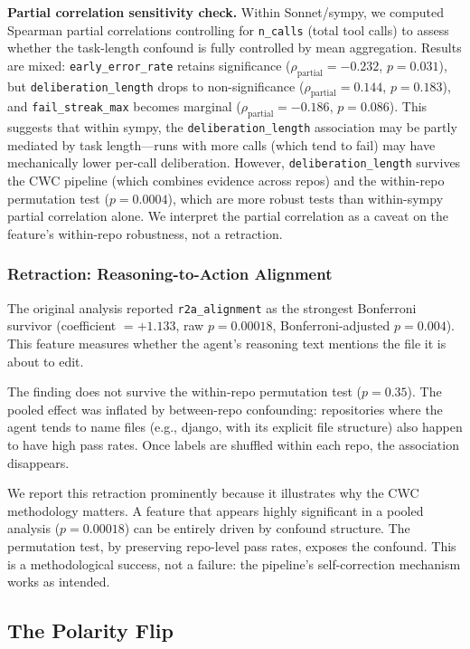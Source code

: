 \documentclass[11pt]{article}
\newcommand{\feat}[1]{\texttt{#1}}
\newcommand{\rtalign}{\feat{r2a\_alignment}}
\begin{document}
\textbf{Partial correlation sensitivity check.}
Within Sonnet/sympy, we computed Spearman partial correlations controlling for \feat{n\_calls} (total tool calls) to assess whether the task-length confound is fully controlled by mean aggregation.
Results are mixed: \feat{early\_error\_rate} retains significance ($\rho_{\text{partial}} = -0.232$, $p = 0.031$), but \feat{deliberation\_length} drops to non-significance ($\rho_{\text{partial}} = 0.144$, $p = 0.183$), and \feat{fail\_streak\_max} becomes marginal ($\rho_{\text{partial}} = -0.186$, $p = 0.086$).
This suggests that within sympy, the \feat{deliberation\_length} association may be partly mediated by task length---runs with more calls (which tend to fail) may have mechanically lower per-call deliberation.
However, \feat{deliberation\_length} survives the CWC pipeline (which combines evidence across repos) and the within-repo permutation test ($p = 0.0004$), which are more robust tests than within-sympy partial correlation alone.
We interpret the partial correlation as a caveat on the feature's within-repo robustness, not a retraction.


\subsubsection{Retraction: Reasoning-to-Action Alignment}
\label{sec:retraction}

The original analysis reported \rtalign{} as the strongest Bonferroni survivor (coefficient $= +1.133$, raw $p = 0.00018$, Bonferroni-adjusted $p = 0.004$).
This feature measures whether the agent's reasoning text mentions the file it is about to edit.

The finding does not survive the within-repo permutation test ($p = 0.35$).
The pooled effect was inflated by between-repo confounding: repositories where the agent tends to name files (e.g., django, with its explicit file structure) also happen to have high pass rates.
Once labels are shuffled within each repo, the association disappears.

We report this retraction prominently because it illustrates why the CWC methodology matters.
A feature that appears highly significant in a pooled analysis ($p = 0.00018$) can be entirely driven by confound structure.
The permutation test, by preserving repo-level pass rates, exposes the confound.
This is a methodological success, not a failure: the pipeline's self-correction mechanism works as intended.


\subsection{The Polarity Flip}
\label{sec:polarity}
\end{document}
